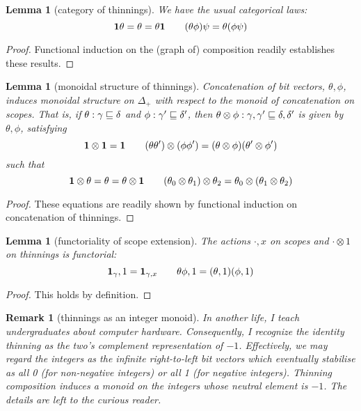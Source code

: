 \documentclass{jfp1}
\newtheorem{lemma}[theorem]{Lemma}
\newtheorem{remark}[theorem]{Remark}
\begin{document}
\begin{lemma}[category of thinnings]
  We have the usual categorical laws:
  \[
    \mathbf{1}\theta = \theta = \theta\mathbf{1} \qquad
    (\theta\phi)\psi = \theta(\phi\psi)
    \]
\end{lemma}
\begin{proof}
  Functional induction on the (graph of) composition readily establishes these results.
\end{proof}

\begin{lemma}[monoidal structure of thinnings]
  Concatenation of bit vectors, $\theta,\phi$, induces monoidal
  structure on $\Delta_+$ with respect to the monoid of concatenation
  on scopes. That is, if $\theta:\gamma\sqsubseteq\delta$ and
  $\phi:\gamma'\sqsubseteq\delta'$, then $\theta\otimes\phi :
  \gamma,\gamma'\sqsubseteq\delta,\delta'$
  is given by $\theta,\phi$, satisfying
  \[
    \mathbf{1}\otimes\mathbf{1} = \mathbf{1} \qquad
    (\theta\theta')\otimes(\phi\phi') =
     (\theta\otimes\phi)(\theta'\otimes\phi')
   \]
   such that
   \[
     \mathbf{1}\otimes\theta = \theta = \theta\otimes\mathbf{1}\qquad
     (\theta_0\otimes\theta_1)\otimes\theta_2 = \theta_0\otimes(\theta_1\otimes\theta_2)
   \]
\end{lemma}
\begin{proof}
  These equations are readily shown by functional induction on
  concatenation of thinnings.
\end{proof}

\begin{lemma}[functoriality of scope extension]
  The actions $\cdot,x$ on scopes and $\cdot\otimes1$ on thinnings is functorial:
  \[
    \mathbf{1}_\gamma,1 = \mathbf{1}_{\gamma,x}\qquad \theta\phi,1 = (\theta,1)(\phi,1)
    \]
\end{lemma}
\begin{proof}
  This holds by definition.
\end{proof}

\begin{remark}[thinnings as an integer monoid]
  In another life, I teach undergraduates about computer hardware. Consequently, I recognize the identity thinning as the two's complement representation of $-1$.
  Effectively, we may regard the integers as the infinite right-to-left bit vectors which eventually stabilise as all 0 (for non-negative integers) or all 1 (for negative integers). Thinning composition induces a monoid on the integers whose neutral element is $-1$. The details are left to the curious reader.
\end{remark}
\end{document}
